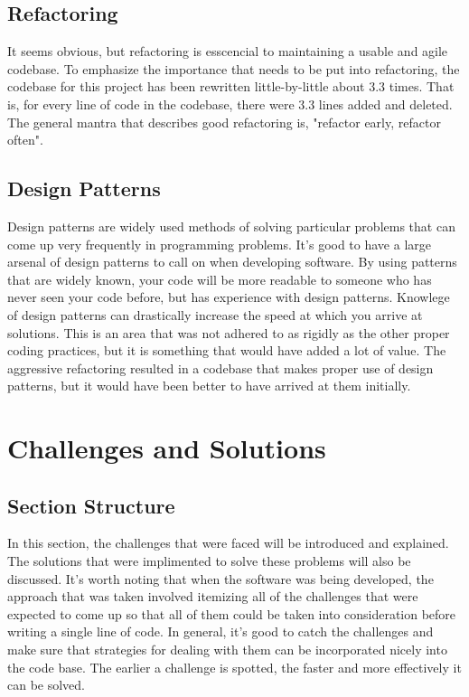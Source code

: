 \documentclass[se]{uw-wkrpt}
\begin{document}
\subsection{Refactoring}

It seems obvious, but refactoring is esscencial to maintaining a usable and agile
codebase. To emphasize the importance that needs to be put into refactoring, the 
codebase for this project has been rewritten little-by-little about 3.3 times.
That is, for every line of code in the codebase, there were 3.3 lines added and deleted.
The general mantra that describes good refactoring is, "refactor early, refactor often".

\subsection{Design Patterns}

Design patterns are widely used methods of solving particular problems that can
come up very frequently in programming problems. It's good to have a large arsenal
of design patterns to call on when developing software. By using patterns that
are widely known, your code will be more readable to someone who has never seen
your code before, but has experience with design patterns. Knowlege of design
patterns can drastically increase the speed at which you arrive at solutions.
This is an area that was not adhered to as rigidly as the other proper coding practices,
but it is something that would have added a lot of value. The aggressive refactoring
resulted in a codebase that makes proper use of design patterns, but it would
have been better to have arrived at them initially.

\section{Challenges and Solutions}

\subsection{Section Structure}

In this section, the challenges that were faced will be introduced and
explained. The solutions that were implimented to solve these problems will
also be discussed. It's worth noting that when the software was being developed, 
the approach that was taken involved itemizing all of the challenges that were 
expected to come up so that all of them could be taken into consideration before 
writing a single line of code. In general, it's good to catch the challenges and
make sure that strategies for dealing with them can be incorporated nicely into
the code base. The earlier a challenge is spotted, the faster and more effectively
it can be solved.
\end{document}
